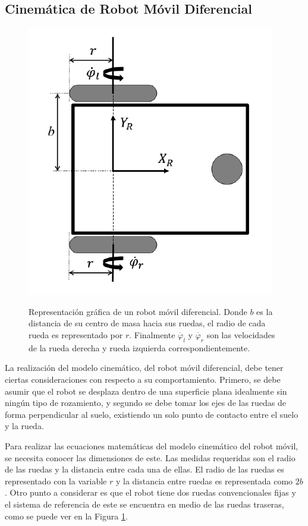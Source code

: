 \subsection{Cinemática de Robot Móvil Diferencial}
\begin{figure}%
\centering \footnotesize
{\includegraphics[width=0.40\linewidth]{images/kinematic_model.png}}
\captionsetup{font=footnotesize}
\caption{Representación gráfica de un robot móvil diferencial. Donde 
$b$ es la distancia de su centro de masa hacia sus ruedas, el radio de cada 
rueda es representado por $r$. Finalmente $\dot{\varphi_{l}}$ y 
$\dot{\varphi_{r}}$ son las velocidades de la rueda derecha y rueda izquierda 
correspondientemente.}
\label{fig:RMkinematic}
\end{figure}
La realización del modelo cinemático, del robot móvil diferencial, debe 
tener ciertas consideraciones con respecto a su comportamiento. Primero, 
se debe asumir que el robot se desplaza dentro de una superficie plana 
idealmente sin ningún tipo de rozamiento, y segundo se debe tomar los ejes
de las ruedas de forma perpendicular al suelo, existiendo un solo punto 
de contacto entre el suelo y la rueda.


Para realizar las ecuaciones matemáticas del modelo cinemático del robot móvil, se
necesita conocer las dimensiones de este. Las medidas requeridas son el radio de las 
ruedas y la distancia entre cada una de ellas. El radio de las ruedas es representado
con la variable $r$ y la distancia entre ruedas es representada como $2b$. Otro punto 
a considerar es que el robot tiene dos ruedas convencionales fijas y el sistema de
referencia de este se encuentra en medio de las ruedas traseras, como se puede ver en 
la Figura \ref{fig:RMkinematic}.

